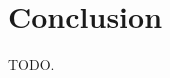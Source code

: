 \IfFileExists{IEEEtran.cls}{\ieeetrue\documentclass[conference]{IEEEtran}}{\ieeefalse\documentclass[twocolumn,10pt]{article}}
\begin{document}
\section{Conclusion}
TODO.
\end{document}
